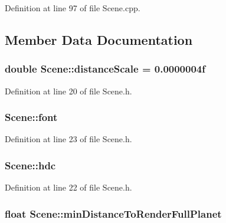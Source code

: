 Definition at line 97 of file Scene.\+cpp.



\subsection{Member Data Documentation}
\hypertarget{class_scene_ae69efb71a67f64073b2c7b601e59973a}{
\subsubsection[{distance\+Scale}]{\setlength{\rightskip}{0pt plus 5cm}double Scene\+::distance\+Scale = 0.\+0000004f\hspace{0.3cm}{\ttfamily [protected]}}}\label{class_scene_ae69efb71a67f64073b2c7b601e59973a}


Definition at line 20 of file Scene.\+h.

\hypertarget{class_scene_a1efe4e0081be96c06ad22a682a898310}{
\subsubsection[{font}]{ Scene\+::font\hspace{0.3cm}{\ttfamily [protected]}}}\label{class_scene_a1efe4e0081be96c06ad22a682a898310}


Definition at line 23 of file Scene.\+h.

\hypertarget{class_scene_a5ec6d8807ffa395ae8f4feda8ccc0560}{
\subsubsection[{hdc}]{ Scene\+::hdc\hspace{0.3cm}{\ttfamily [protected]}}}\label{class_scene_a5ec6d8807ffa395ae8f4feda8ccc0560}


Definition at line 22 of file Scene.\+h.

\hypertarget{class_scene_a9e5749b2c90c6376bb86fb9cc2dc3eac}{
\subsubsection[{min\+Distance\+To\+Render\+Full\+Planet}]{\setlength{\rightskip}{0pt plus 5cm}float Scene\+::min\+Distance\+To\+Render\+Full\+Planet\hspace{0.3cm}{\ttfamily [protected]}}}\label{class_scene_a9e5749b2c90c6376bb86fb9cc2dc3eac}


